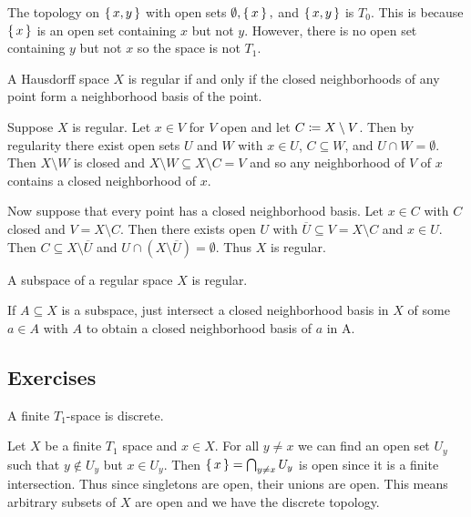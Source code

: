 \documentclass[letterpaper, 11pt]{article}
\begin{document}
\begin{ex}
  The topology on $\set{x, y}$ with open sets $\emptyset, \set{x},$ and $\set{x, y}$ is $T_{0}$.
  This is because $\set{x}$ is an open set containing $x$ but not $y$.
  However, there is no open set containing $y$ but not $x$ so the space is not $T_{1}$.
\end{ex}

\begin{prop}\label{prop: regular_iff_closed_neighborhood_basis}
  A Hausdorff space $X$ is regular if and only if the closed neighborhoods of any point form a neighborhood basis of the point.
\end{prop}
\begin{pf}
  Suppose $X$ is regular.
  Let $x \in V$ for $V$ open and let $C \coloneqq X \setminus V$.
  Then by regularity there exist open sets $U$ and $W$ with $x \in U$, $C \subseteq W$, and $U \cap W = \emptyset$.
  Then $X \setminus W$ is closed and $X \setminus W \subseteq X \setminus C = V$ and so any neighborhood of $V$ of $x$ contains a closed neighborhood of $x$.

  Now suppose that every point has a closed neighborhood basis.
  Let $x \in C$ with $C$ closed and $V = X \setminus C$.
  Then there exists open $U$ with $\overline{U} \subseteq V = X \setminus C$ and $x \in U$.
  Then $C \subseteq X \setminus \overline{U}$ and $U \cap (X \setminus \overline{U}) = \emptyset$.
  Thus $X$ is regular.
\end{pf}

\begin{cor}
  A subspace of a regular space $X$ is regular.
\end{cor}
\begin{pf}
  If $A \subseteq X$ is a subspace, just intersect a closed neighborhood basis in $X$ of some $a \in A$ with $A$ to obtain a closed neighborhood basis of $a$ in A.
\end{pf}

\subsection*{Exercises}

\begin{exercise}
  A finite $T_{1}$-space is discrete.
\end{exercise}
\begin{pf}
  Let $X$ be a finite $T_{1}$ space and $x \in X$.
  For all $y \neq x$ we can find an open set $U_{y}$ such that $y \notin U_{y}$ but $x \in U_{y}$.
  Then $\set{x} = \bigcap_{y \neq x} U_{y}$ is open since it is a finite intersection.
  Thus since singletons are open, their unions are open.
  This means arbitrary subsets of $X$ are open and we have the discrete topology.
\end{pf}
\end{document}
